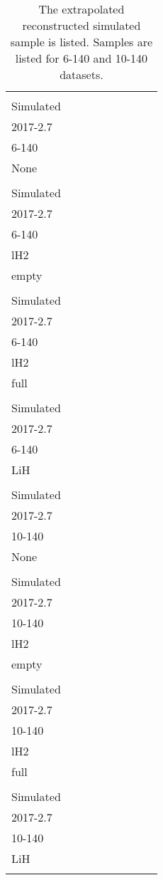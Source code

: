 \begin{table}
\centering
\caption{The extrapolated reconstructed simulated sample is listed.  Samples are listed for 6-140 and 10-140 datasets.\label{tab:mc_cuts_summary_2_1}}
\begin{tabular}[pos]{l|cccccccc}
                                                   & \splitcell{\\Simulated\\2017-2.7\\6-140\\None\\} & \splitcell{\\Simulated\\2017-2.7\\6-140\\lH2\\empty\\} & \splitcell{\\Simulated\\2017-2.7\\6-140\\lH2\\full\\} & \splitcell{\\Simulated\\2017-2.7\\6-140\\LiH\\} & \splitcell{\\Simulated\\2017-2.7\\10-140\\None\\} & \splitcell{\\Simulated\\2017-2.7\\10-140\\lH2\\empty\\} & \splitcell{\\Simulated\\2017-2.7\\10-140\\lH2\\full\\} & \splitcell{\\Simulated\\2017-2.7\\10-140\\LiH\\} \\

\end{tabular}
\end{table}
